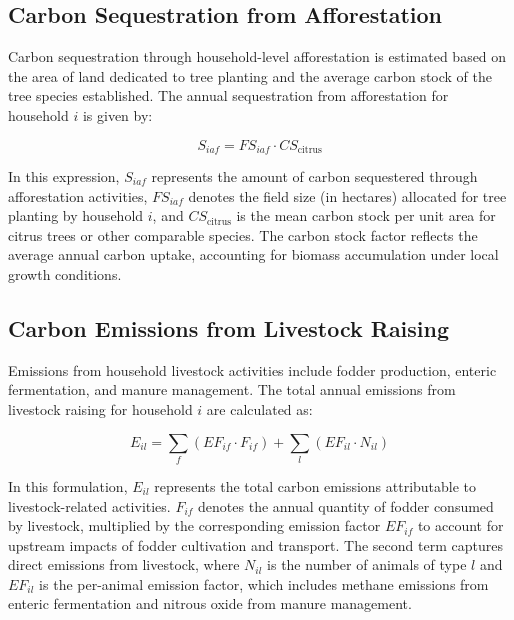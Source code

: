 \documentclass[12pt,a4paper]{article}%
\begin{document}
\subsection{Carbon Sequestration from Afforestation}

Carbon sequestration through household-level afforestation is estimated based on the area of land dedicated to tree planting and the average carbon stock of the tree species established. The annual sequestration from afforestation for household $i$ is given by:

\begin{equation}
S_{iaf} = FS_{iaf} \cdot CS_{\text{citrus}}
\end{equation}

In this expression, $S_{iaf}$ represents the amount of carbon sequestered through afforestation activities, $FS_{iaf}$ denotes the field size (in hectares) allocated for tree planting by household $i$, and $CS_{\text{citrus}}$ is the mean carbon stock per unit area for citrus trees or other comparable species. The carbon stock factor reflects the average annual carbon uptake, accounting for biomass accumulation under local growth conditions.


\subsection{Carbon Emissions from Livestock Raising}

Emissions from household livestock activities include fodder production, enteric fermentation, and manure management. The total annual emissions from livestock raising for household $i$ are calculated as:

\begin{equation}
E_{il} = \sum_f (EF_{if} \cdot F_{if}) + \sum_l (EF_{il} \cdot N_{il})
\end{equation}

In this formulation, $E_{il}$ represents the total carbon emissions attributable to livestock-related activities. $F_{if}$ denotes the annual quantity of fodder consumed by livestock, multiplied by the corresponding emission factor $EF_{if}$ to account for upstream impacts of fodder cultivation and transport. The second term captures direct emissions from livestock, where $N_{il}$ is the number of animals of type $l$ and $EF_{il}$ is the per-animal emission factor, which includes methane emissions from enteric fermentation and nitrous oxide from manure management.
\end{document}
